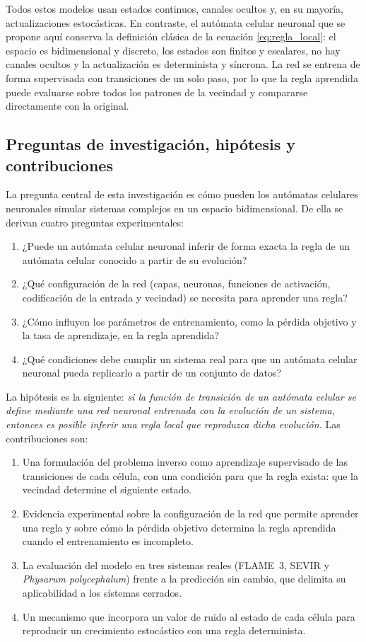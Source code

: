 Todos estos modelos usan estados continuos, canales ocultos y, en su mayoría, actualizaciones estocásticas. En contraste, el autómata celular neuronal que se propone aquí conserva la definición clásica de la ecuación \eqref{eq:regla_local}: el espacio es bidimensional y discreto, los estados son finitos y escalares, no hay canales ocultos y la actualización es determinista y síncrona. La red se entrena de forma supervisada con transiciones de un solo paso, por lo que la regla aprendida puede evaluarse sobre todos los patrones de la vecindad y compararse directamente con la original.

\subsection{Preguntas de investigación, hipótesis y contribuciones}

La pregunta central de esta investigación es cómo pueden los autómatas celulares neuronales simular sistemas complejos en un espacio bidimensional. De ella se derivan cuatro preguntas experimentales:

\begin{enumerate}[label=\textbf{P\arabic*.}]
	\item ¿Puede un autómata celular neuronal inferir de forma exacta la regla de un autómata celular conocido a partir de su evolución?
	\item ¿Qué configuración de la red (capas, neuronas, funciones de activación, codificación de la entrada y vecindad) se necesita para aprender una regla?
	\item ¿Cómo influyen los parámetros de entrenamiento, como la pérdida objetivo y la tasa de aprendizaje, en la regla aprendida?
	\item ¿Qué condiciones debe cumplir un sistema real para que un autómata celular neuronal pueda replicarlo a partir de un conjunto de datos?
\end{enumerate}

La hipótesis es la siguiente: \textit{si la función de transición de un autómata celular se define mediante una red neuronal entrenada con la evolución de un sistema, entonces es posible inferir una regla local que reproduzca dicha evolución.} Las contribuciones son:

\begin{enumerate}
	\item Una formulación del problema inverso como aprendizaje supervisado de las transiciones de cada célula, con una condición para que la regla exista: que la vecindad determine el siguiente estado.
	\item Evidencia experimental sobre la configuración de la red que permite aprender una regla y sobre cómo la pérdida objetivo determina la regla aprendida cuando el entrenamiento es incompleto.
	\item La evaluación del modelo en tres sistemas reales (FLAME~3, SEVIR y \textit{Physarum polycephalum}) frente a la predicción sin cambio, que delimita su aplicabilidad a los sistemas cerrados.
	\item Un mecanismo que incorpora un valor de ruido al estado de cada célula para reproducir un crecimiento estocástico con una regla determinista.
\end{enumerate}